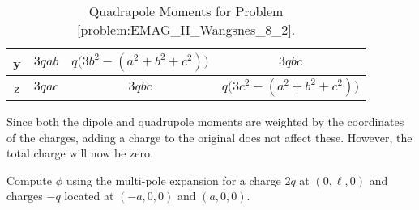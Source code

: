 \documentclass[crop=false,class=book,oneside]{standalone}
\begin{document}
\begin{solution}
\begin{table}[H]
{\begin{tabular}{|c|c|c|c|}
                            \hline
                            y&$3qab$&$q\big(3b^{2}-(a^{2}+b^{2}+c^{2})\big)$
                            &$3qbc$\\
                            \hline
                            z&$3qac$&$3qbc$
                            &$q\big(3c^{2}-(a^{2}+b^{2}+c^{2})\big)$\\
                            \hline
                        \end{tabular}
                    }
                    \caption{Quadrapole Moments for Problem
                             \ref{problem:EMAG_II_Wangsnes_8_2}.}
                    \label{tab:EMAG_2_Problem_8_2_Wangsness_Quadrupole}
                \end{table}
                Since both the dipole and quadrupole moments are weighted
                by the coordinates of the charges, adding a charge to the
                original does not affect these. However, the total charge will
                now be zero.
            \end{solution}
            \begin{problem}
                \label{problem:EMAG_II_Wangsnes_8_4}
                Compute $\phi$ using the multi-pole expansion for a
                charge $2q$ at $(0,\ell,0)$ and charges $-q$ located at
                $(-a,0,0)$ and $(a,0,0)$.
            \end{problem}
\end{document}

